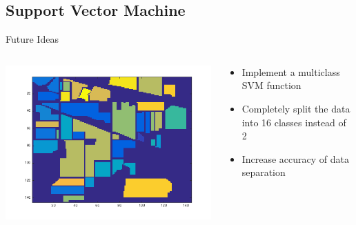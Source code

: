 \documentclass[11pt]{beamer}
\begin{document}
\subsection{Support Vector Machine}
\begin{frame}{Future Ideas}
\begin{columns}[T]
\begin{column}{.48\textwidth}
\includegraphics[scale=.4]{groundtruth.png}
\end{column}
\hfill
\begin{column}{.48\textwidth}
\begin{itemize}
\item Implement a multiclass SVM function
\item Completely split the data into 16 classes instead of 2
\item Increase accuracy of data separation
\end{itemize}
\end{column}
\end{columns}
\end{frame}
\end{document}
